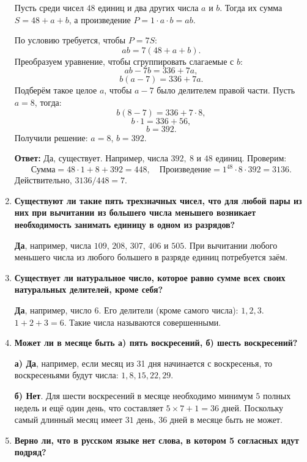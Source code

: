 \documentclass[12pt, a4paper]{article}
\begin{document}
\begin{enumerate}[label=\arabic*., wide=0pt, leftmargin=*]
    Пусть среди чисел $48$ единиц и два других числа $a$ и $b$. Тогда их сумма $S = 48 + a + b$, а произведение $P = 1 \cdot a \cdot b = ab$.

    По условию требуется, чтобы $P = 7S$:
    \[
    ab = 7(48 + a + b).
    \]
    Преобразуем уравнение, чтобы сгруппировать слагаемые с $b$:
    \[
    ab - 7b = 336 + 7a,
    \]
    \[
    b(a - 7) = 336 + 7a.
    \]
    Подберём такое целое $a$, чтобы $a-7$ было делителем правой части. Пусть $a = 8$, тогда:
    \[
    b(8 - 7) = 336 + 7 \cdot 8,
    \]
    \[
    b \cdot 1 = 336 + 56,
    \]
    \[
    b = 392.
    \]
    Получили решение: $a=8$, $b=392$.

    \textbf{Ответ:} Да, существует. Например, числа $392,\ 8$ и $48$ единиц. Проверим:
    \[
    \text{Сумма} = 48 \cdot 1 + 8 + 392 = 448, \quad \text{Произведение} = 1^{48} \cdot 8 \cdot 392 = 3136.
    \]
    Действительно, $3136 / 448 = 7$.

    \item \textbf{Существуют ли такие пять трехзначных чисел, что для любой пары из них при вычитании из большего числа меньшего возникает необходимость занимать единицу в одном из разрядов?}

    \textbf{Да}, например, числа $109$, $208$, $307$, $406$ и $505$. При вычитании любого меньшего числа из любого большего в разряде единиц потребуется заём.

    \item \textbf{Существует ли натуральное число, которое равно сумме всех своих натуральных делителей, кроме себя?}

    \textbf{Да}, например, число $6$. Его делители (кроме самого числа): $1, 2, 3$. $1 + 2 + 3 = 6$. Такие числа называются совершенными.

    \item \textbf{Может ли в месяце быть а) пять воскресений, б) шесть воскресений?}

    \textbf{а) Да}, например, если месяц из 31 дня начинается с воскресенья, то воскресеньями будут числа: $1, 8, 15, 22, 29$.

    \textbf{б) Нет}. Для шести воскресений в месяце необходимо минимум $5$ полных недель и ещё один день, что составляет $5 \times 7 + 1 = 36$ дней. Поскольку самый длинный месяц имеет $31$ день, $36$ дней в месяце быть не может.

    \item \textbf{Верно ли, что в русском языке нет слова, в котором 5 согласных идут подряд?}


\end{enumerate}
\end{document}
